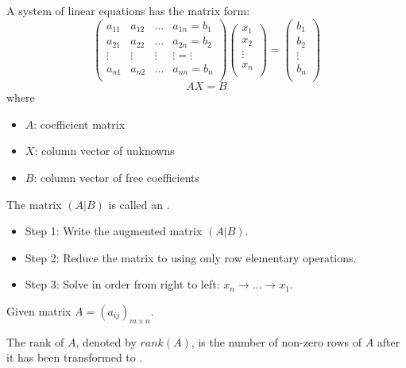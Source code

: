     \par A system of linear equations has the matrix form:
    \[
      \begin{pmatrix}
        a_{11} & a_{12} & \ldots & a_{1n} = b_{1} \\
        a_{21} & a_{22} & \ldots & a_{2n} = b_{2} \\
        \vdots & \vdots & \vdots & \vdots = \vdots \\
        a_{n1} & a_{n2} & \ldots & a_{nn} = b_{n} \\
      \end{pmatrix}
      \begin{pmatrix}
        x_{1} \\
        x_{2} \\
        \vdots \\
        x_{n} \\
      \end{pmatrix}
      =
      \begin{pmatrix}
        b_{1} \\
        b_{2} \\
        \vdots \\
        b_{n} \\
      \end{pmatrix}
    \]
    \[
      AX = B
    \]
    where
    \begin{itemize}
      \item $A$: coefficient matrix
      \item $X$: column vector of unknowns
      \item $B$: column vector of free coefficients
    \end{itemize}

    \par The matrix $(A|B)$ is called an .

    \begin{itemize}
      \item Step 1: Write the augmented matrix $(A|B)$.
      \item Step 2: Reduce the matrix to  using only
        row elementary operations.
      \item Step 3: Solve in order from right to left: $x_{n} \to ... \to x_{1}$.
    \end{itemize}


    \par Given matrix $A = (a_{ij})_{m \times n}$.
    \par The rank of $A$, denoted by $rank(A)$, is the number of non-zero rows of $A$
    after it has been transformed to .

